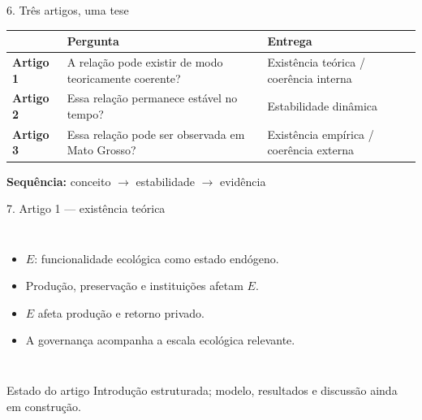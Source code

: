 \documentclass[aspectratio=169,11pt]{beamer}
\begin{document}
\begin{frame}{6. Três artigos, uma tese}
  \centering
  \small
  \begin{tabular}{>{\bfseries}p{1.8cm}p{5.0cm}p{4.0cm}}
    \toprule
    & Pergunta & Entrega \tabularnewline
    \midrule
    Artigo 1 & A relação pode existir de modo teoricamente coerente? &
      Existência teórica / coerência interna \tabularnewline[0.25cm]
    Artigo 2 & Essa relação permanece estável no tempo? &
      Estabilidade dinâmica \tabularnewline[0.25cm]
    Artigo 3 & Essa relação pode ser observada em Mato Grosso? &
      Existência empírica / coerência externa \tabularnewline
    \bottomrule
  \end{tabular}

  \vfill
  \textbf{Sequência:} conceito $\longrightarrow$ estabilidade $\longrightarrow$ evidência

\end{frame}

\begin{frame}{7. Artigo 1 — existência teórica}
  \begin{columns}[T,onlytextwidth]
      \begin{itemize}
        \item $E$: funcionalidade ecológica como estado endógeno.
        \item Produção, preservação e instituições afetam $E$.
        \item $E$ afeta produção e retorno privado.
        \item A governança acompanha a escala ecológica relevante.
      \end{itemize}

  \end{columns}

  \vfill
  \begin{alertblock}{Estado do artigo}
    Introdução estruturada; modelo, resultados e discussão ainda em construção.
  \end{alertblock}

\end{frame}
\end{document}
